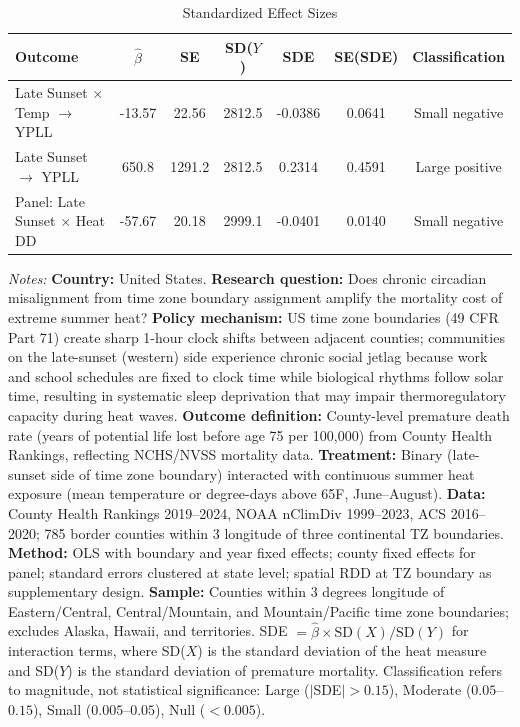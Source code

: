 \begin{table}[htbp]
\centering
\caption{Standardized Effect Sizes}
\label{tab:sde}
\small
\begin{tabular}{lcccccc}
\hline\hline
Outcome & $\hat{\beta}$ & SE & SD($Y$) & SDE & SE(SDE) & Classification \\
\hline
Late Sunset $\times$ Temp $\to$ YPLL & -13.57 & 22.56 & 2812.5 & -0.0386 & 0.0641 & Small negative \\
Late Sunset $\to$ YPLL & 650.8 & 1291.2 & 2812.5 & 0.2314 & 0.4591 & Large positive \\
Panel: Late Sunset $\times$ Heat DD & -57.67 & 20.18 & 2999.1 & -0.0401 & 0.0140 & Small negative \\
\hline\hline
\end{tabular}
\begin{tablenotes}[flushleft]\small
\item \textit{Notes:} \textbf{Country:} United States. \textbf{Research question:} Does chronic circadian misalignment from time zone boundary assignment amplify the mortality cost of extreme summer heat? \textbf{Policy mechanism:} US time zone boundaries (49 CFR Part 71) create sharp 1-hour clock shifts between adjacent counties; communities on the late-sunset (western) side experience chronic social jetlag because work and school schedules are fixed to clock time while biological rhythms follow solar time, resulting in systematic sleep deprivation that may impair thermoregulatory capacity during heat waves. \textbf{Outcome definition:} County-level premature death rate (years of potential life lost before age 75 per 100,000) from County Health Rankings, reflecting NCHS/NVSS mortality data. \textbf{Treatment:} Binary (late-sunset side of time zone boundary) interacted with continuous summer heat exposure (mean temperature or degree-days above 65\textdegree{}F, June--August). \textbf{Data:} County Health Rankings 2019--2024, NOAA nClimDiv 1999--2023, ACS 2016--2020; 785 border counties within 3\textdegree{} longitude of three continental TZ boundaries. \textbf{Method:} OLS with boundary and year fixed effects; county fixed effects for panel; standard errors clustered at state level; spatial RDD at TZ boundary as supplementary design. \textbf{Sample:} Counties within 3 degrees longitude of Eastern/Central, Central/Mountain, and Mountain/Pacific time zone boundaries; excludes Alaska, Hawaii, and territories. SDE $= \hat{\beta} \times \text{SD}(X) / \text{SD}(Y)$ for interaction terms, where SD($X$) is the standard deviation of the heat measure and SD($Y$) is the standard deviation of premature mortality. Classification refers to magnitude, not statistical significance: Large ($|$SDE$| > 0.15$), Moderate ($0.05$--$0.15$), Small ($0.005$--$0.05$), Null ($< 0.005$).
\end{tablenotes}
\end{table}


